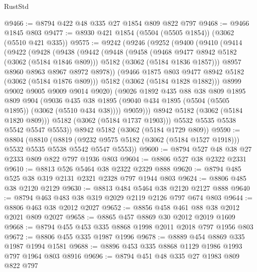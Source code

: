 \begin{lexlean}{RustStd}
\begin{coremodule}
@9466 := @8794 @422 @48 @335 @27 @1854 @809 @822 @797
@9468 := @9466 @1845 @803
@9477 := @8930 @421 @1854 (@5504 (@5505 @1854)) (@3062 (@5510 @421 @335))
@9575 := @9242
    (@9246
      (@9252
        (@9400
          (@9410
            (@9414
              (@9422
                (@9428
                  (@9438
                    (@9442
                      (@9448
                        (@9458
                          (@9468 @9477 @8942 @5182 (@3062 (@5184 @1846 @809)))
                          @5182
                          (@3062 (@5184 @1836 @1857)))
                        @8957
                        @8960
                        @8963
                        @8967
                        @8972
                        @8978))
                    (@9466 @1875 @803 @9477 @8942 @5182 (@3062 (@5184 @1876 @809)))
                    @5182
                    (@3062 (@5184 @1828 @1882)))
                  @8999
                  @9002
                  @9005
                  @9009
                  @9014
                  @9020)
                (@9026
                  @1892
                  @435
                  @88
                  @38
                  @809
                  @1895
                  @809
                  @904
                  (@9036
                    @435
                    @38
                    @1895
                    (@9040 @434 @1895 (@5504 (@5505 @1895)) (@3062 (@5510 @434 @38))))
                  @9059)))
            @8942
            @5182
            (@3062 (@5184 @1820 @809)))
          @5182
          (@3062 (@5184 @1737 @1903)))
        @5532
        @5535
        @5538
        @5542
        @5547
        @5553))
    @8942
    @5182
    (@3062 (@5184 @1729 @809))
@9590 := @8804
    (@8810
      (@8819 (@9232 @9575 @5182 (@3062 (@5184 @1527 @1918))) @5532 @5535 @5538 @5542 @5547 @5553))
@9600 := @8794 @527 @48 @38 @27 @2333 @809 @822 @797 @1936 @803
@9604 := @8806 @527 @38 @2322 @2331
@9610 := @8813 @526 @5464 @38 @2322 @2329 @888
@9620 := @8794 @485 @525 @38 @319 @2131 @2321 @2328 @797 @1944 @803
@9624 := @8806 @485 @38 @2120 @2129
@9630 := @8813 @484 @5464 @38 @2120 @2127 @888
@9640 := @8794 @463 @483 @38 @319 @2029 @2119 @2126 @797 @674 @803
@9644 := @8806 @463 @38 @2012 @2027
@9652 := @8856 @458 @461 @88 @38 @2012 @2021 @809 @2027
@9658 := @8865 @457 @8869 @30 @2012 @2019 @1609
@9668 := @8794 @455 @453 @335 @8868 @1998 @2011 @2018 @797 @1956 @803
@9672 := @8806 @455 @335 @1987 @1996
@9678 := @8889 @454 @8869 @335 @1987 @1994 @1581
@9688 := @8896 @453 @335 @8868 @1129 @1986 @1993 @797 @1964 @803 @8916
@9696 := @8794 @451 @48 @335 @27 @1983 @809 @822 @797

\end{coremodule}
\end{lexlean}
